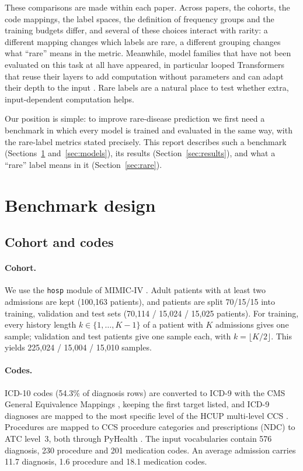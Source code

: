 \documentclass[11pt]{article}
\begin{document}
These comparisons are made within each paper. Across papers, the cohorts, the code mappings, the label spaces,
the definition of frequency groups and the training budgets differ, and several of these choices interact with
rarity: a different mapping changes which labels are rare, a different grouping changes what ``rare'' means in
the metric. Meanwhile, model families that have not been evaluated on this task at all have appeared, in
particular looped Transformers that reuse their layers to add computation without parameters
\citep{dehghani2019universal,giannou2023looped,yang2024looped,geiping2025recurrent,zhu2025ouro} and can adapt their
depth to the input \citep{graves2016act,banino2021pondernet,popescu2026adaptive}. Rare labels are a natural place
to test whether extra, input-dependent computation helps.

Our position is simple: to improve rare-disease prediction we first need a benchmark in which every model is
trained and evaluated in the same way, with the rare-label metrics stated precisely. This report describes such a
benchmark (Sections~\ref{sec:design} and~\ref{sec:models}), its results (Section~\ref{sec:results}), and what a
``rare'' label means in it (Section~\ref{sec:rare}).

\section{Benchmark design}\label{sec:design}

\subsection{Cohort and codes}
\paragraph{Cohort.} We use the \texttt{hosp} module of MIMIC-IV \citep{johnson2023mimiciv}. Adult patients
with at least two admissions are kept (100,163 patients), and patients are split 70/15/15 into training,
validation and test sets (70,114 / 15,024 / 15,025 patients). For training, every history length
$k \in \{1,\dots,K-1\}$ of a patient with $K$ admissions gives one sample; validation and test patients give one
sample each, with $k=\lfloor K/2\rfloor$. This yields 225,024 / 15,004 / 15,010 samples.

\paragraph{Codes.} ICD-10 codes (54.3\% of diagnosis rows) are converted to ICD-9 with the CMS General
Equivalence Mappings \citep{cms2018gem}, keeping the first target listed, and ICD-9 diagnoses are mapped to the
most specific level of the HCUP multi-level CCS \citep{hcup2015}. Procedures are mapped to CCS procedure
categories and prescriptions (NDC) to ATC level~3, both through PyHealth \citep{yang2023pyhealth}. The input
vocabularies contain 576 diagnosis, 230 procedure and 201 medication codes. An average admission carries
11.7 diagnosis, 1.6 procedure and 18.1 medication codes.
\end{document}
